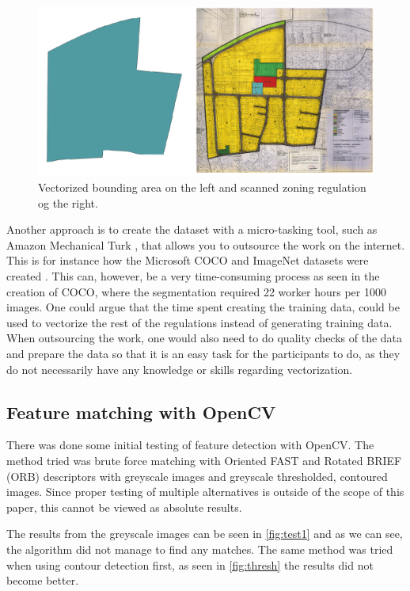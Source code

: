 \begin{figure}[H]
    \centering
    \includegraphics[width=\linewidth]{fig/georef-problem.png}
    \caption{Vectorized bounding area on the left and scanned zoning regulation og the right.}
    \label{fig:georeferencing}
\end{figure}

Another approach is to create the dataset with a micro-tasking tool, such as Amazon Mechanical Turk \cite{AmazonMechanicalTurk2017}, that allows you to outsource the work on the internet. This is for instance how the Microsoft COCO and ImageNet datasets were created \cite{Lin2014}. This can, however, be a very time-consuming process as seen in the creation of COCO, where the segmentation required 22 worker hours per 1000 images. One could argue that the time spent creating the training data, could be used to vectorize the rest of the regulations instead of generating training data. When outsourcing the work, one would also need to do quality checks of the data and prepare the data so that it is an easy task for the participants to do, as they do not necessarily have any knowledge or skills regarding vectorization.

\subsection{Feature matching with OpenCV}
There was done some initial testing of feature detection with OpenCV. The method tried was brute force matching with Oriented FAST and Rotated BRIEF (ORB) descriptors with greyscale images and greyscale thresholded, contoured images. Since proper testing of multiple alternatives is outside of the scope of this paper, this cannot be viewed as absolute results.

The results from the greyscale images can be seen in \autoref{fig:test1} and as we can see, the algorithm did not manage to find any matches. The same method was tried when using contour detection first, as seen in \autoref{fig:thresh} the results did not become better.


